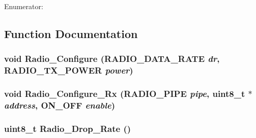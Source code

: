 \begin{Desc}
\item[Enumerator: ]\par
\begin{description}
\item[{\em 
RADIO\_\-WAIT\_\-FOR\_\-TX\label{radio_8h_a250ed2e4d10fc8b93e94f7772aba0f0fdee520942a5a103c739837cba3be3e4}
}]\item[{\em 
RADIO\_\-RETURN\_\-ON\_\-TX\label{radio_8h_a250ed2e4d10fc8b93e94f7772aba0f00030a44a699c2df9af0e0888df5e61a6}
}]\end{description}
\end{Desc}



\subsection{Function Documentation}
\subsubsection{\setlength{\rightskip}{0pt plus 5cm}void Radio\_\-Configure ({\bf RADIO\_\-DATA\_\-RATE} {\em dr}, {\bf RADIO\_\-TX\_\-POWER} {\em power})}\label{radio_8h_2b3992516039b2f97f27c5d05988c679}


\subsubsection{\setlength{\rightskip}{0pt plus 5cm}void Radio\_\-Configure\_\-Rx ({\bf RADIO\_\-PIPE} {\em pipe}, uint8\_\-t $\ast$ {\em address}, {\bf ON\_\-OFF} {\em enable})}\label{radio_8h_97901f9e23b421091e6c30a651408ae0}


\subsubsection{\setlength{\rightskip}{0pt plus 5cm}uint8\_\-t Radio\_\-Drop\_\-Rate ()}\label{radio_8h_c6d57def1ababd8d3b749b883addc2f4}


